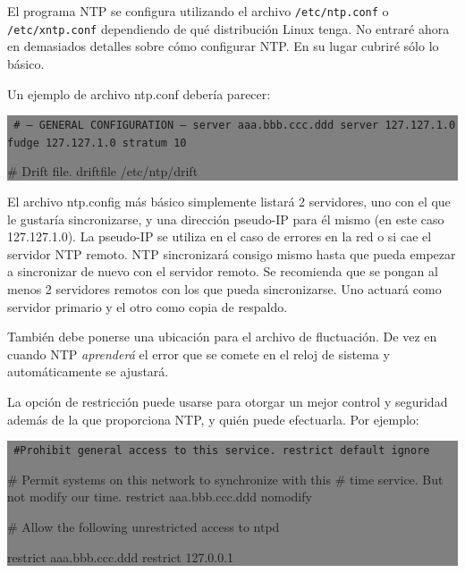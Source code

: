 \documentclass[12pt]{article}
\begin{document}
El programa NTP se configura utilizando el archivo \texttt{/etc/ntp.conf} o
\texttt{/etc/xntp.conf} dependiendo de qué distribución Linux tenga. No entraré
ahora en demasiados detalles sobre cómo configurar NTP. En su lugar cubriré
sólo lo básico.



Un ejemplo de archivo ntp.conf debería parecer:



\colorbox{grey}{\parbox[t]{0.95\linewidth}{ \vspace*{0.5cm} {\tt
\# --- GENERAL CONFIGURATION ---
server  aaa.bbb.ccc.ddd
server  127.127.1.0
fudge   127.127.1.0 stratum 10

\# Drift file.
driftfile /etc/ntp/drift
 } \vspace*{0.5cm} } } 

	

	El archivo ntp.config más básico simplemente listará 2 servidores, uno
con el que le gustaría sincronizarse, y una dirección pseudo-IP para él 
mismo (en este caso 127.127.1.0). La pseudo-IP se utiliza en el caso de
errores en la red o si cae el servidor NTP remoto. NTP sincronizará
consigo mismo hasta que pueda empezar a sincronizar de nuevo con el 
servidor remoto. Se recomienda que se pongan al menos 2 servidores remotos
con los que pueda sincronizarse. Uno actuará como servidor primario y el 
otro como copia de respaldo.



También debe ponerse una ubicación para el archivo de fluctuación. De 
vez en cuando NTP \textit{aprenderá} el error que se comete en el reloj de
sistema y automáticamente se ajustará.



La opción de restricción puede usarse para otorgar un mejor control y 
seguridad además de la que proporciona NTP, y quién puede efectuarla.
Por ejemplo:

\colorbox{grey}{\parbox[t]{0.95\linewidth}{ \vspace*{0.5cm} {\tt 
\#Prohibit general access to this service.
restrict default ignore

\# Permit systems on this network to synchronize with this
\# time service. But not modify our time.
restrict aaa.bbb.ccc.ddd nomodify

\# Allow the following unrestricted access to ntpd

restrict aaa.bbb.ccc.ddd
restrict 127.0.0.1
 } \vspace*{0.5cm} } } 
\end{document}
